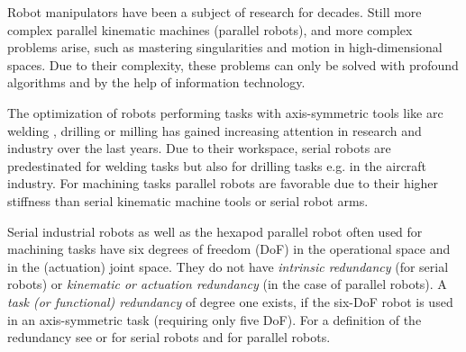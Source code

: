 \documentclass[a4paper,twoside]{article}
\begin{document}
Robot manipulators have been a subject of research for decades.
Still more complex parallel kinematic machines (parallel robots), and more complex problems arise, such as mastering singularities and motion in high-dimensional spaces.
Due to their complexity, these problems can only be solved with profound algorithms and by the help of information technology.

The optimization of robots performing tasks with axis-symmetric tools like arc welding \cite{HuoBar2008}, drilling \cite{GuoDonKe2015} or milling \cite{MousaviGagBouRay2018} has gained increasing attention in research and industry over the last years.
Due to their workspace, serial robots are predestinated for welding tasks but also for drilling tasks e.g. in the aircraft industry.
For machining tasks parallel robots are favorable due to their higher stiffness than serial kinematic machine tools or serial robot arms.

Serial industrial robots as well as the hexapod parallel robot often used for machining tasks have six degrees of freedom (DoF) in the operational space and in the (actuation) joint space.
They do not have \emph{intrinsic redundancy} (for serial robots) or \emph{kinematic or actuation redundancy} (in the case of parallel robots).
A \emph{task (or functional) redundancy} of degree one exists, if the six-DoF robot is used in an axis-symmetric task (requiring only five DoF).
For a definition of the redundancy see \cite{HuoBar2008} or \cite{LegerAng2016} for serial robots and \cite{GosselinSch2018} for parallel robots.
\end{document}

